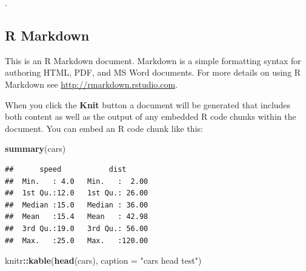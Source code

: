 \documentclass[11pt]{report}
\newenvironment{Shaded}{\begin{snugshade}}{\end{snugshade}}
\newcommand{\AttributeTok}[1]{\textcolor[rgb]{0.13,0.29,0.53}{#1}}
\newcommand{\FunctionTok}[1]{\textcolor[rgb]{0.13,0.29,0.53}{\textbf{#1}}}
\newcommand{\NormalTok}[1]{#1}
\newcommand{\SpecialCharTok}[1]{\textcolor[rgb]{0.81,0.36,0.00}{\textbf{#1}}}
\newcommand{\StringTok}[1]{\textcolor[rgb]{0.31,0.60,0.02}{#1}}
\begin{document}
\clearpage

\thispagestyle{empty}
\tableofcontents
\clearpage

\listoffigures
\listoftables

\fancyhead{}
\fancyfoot{}
\pagestyle{fancyplain}
\setlength{\headheight}{13.59999pt}.

{\newpage\renewcommand{\thepage}{\arabic{page}}\setcounter{page}{1}}

{}

\subsection{R Markdown}\label{r-markdown}

This is an R Markdown document. Markdown is a simple formatting syntax for authoring HTML, PDF, and MS Word documents. For more details on using R Markdown see \url{http://rmarkdown.rstudio.com}.

When you click the \textbf{Knit} button a document will be generated that includes both content as well as the output of any embedded R code chunks within the document. You can embed an R code chunk like this:

\begin{Shaded}
\begin{Highlighting}[]
\FunctionTok{summary}\NormalTok{(cars)}
\end{Highlighting}
\end{Shaded}

\begin{verbatim}
##      speed           dist       
##  Min.   : 4.0   Min.   :  2.00  
##  1st Qu.:12.0   1st Qu.: 26.00  
##  Median :15.0   Median : 36.00  
##  Mean   :15.4   Mean   : 42.98  
##  3rd Qu.:19.0   3rd Qu.: 56.00  
##  Max.   :25.0   Max.   :120.00
\end{verbatim}

\begin{Shaded}
\begin{Highlighting}[]
\NormalTok{knitr}\SpecialCharTok{::}\FunctionTok{kable}\NormalTok{(}\FunctionTok{head}\NormalTok{(cars), }\AttributeTok{caption =} \StringTok{"cars head test"}\NormalTok{)}
\end{Highlighting}
\end{Shaded}
\end{document}
